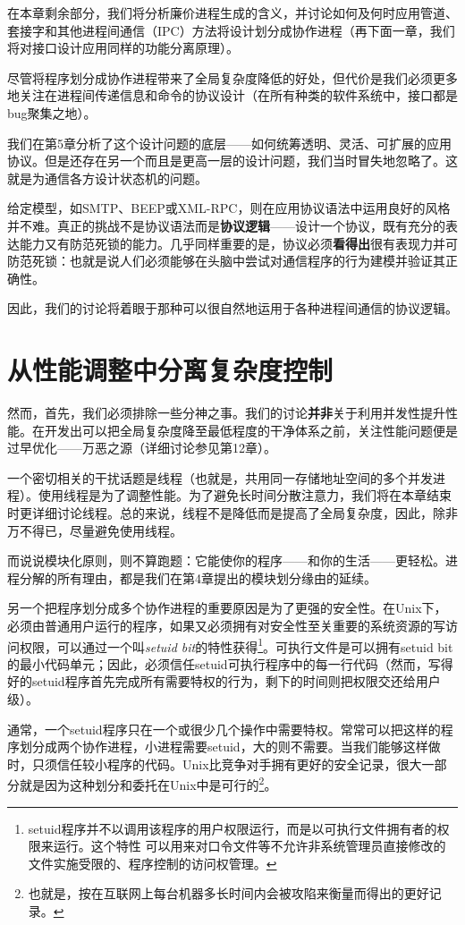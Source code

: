 \documentclass[12pt,oneside]{book}
\begin{document}
在本章剩余部分，我们将分析廉价进程生成的含义，并讨论如何及何时应用管道、套接字和其他进程间通信（IPC）方法将设计划分成协作进程（再下面一章，我们将对接口设计应用同样的功能分离原理）。

尽管将程序划分成协作进程带来了全局复杂度降低的好处，但代价是我们必须更多地关注在进程间传递信息和命令的协议设计（在所有种类的软件系统中，接口都是bug聚集之地）。

我们在第5章分析了这个设计问题的底层——如何统筹透明、灵活、可扩展的应用协议。但是还存在另一个而且是更高一层的设计问题，我们当时冒失地忽略了。这就是为通信各方设计状态机的问题。

给定模型，如SMTP、BEEP或XML-RPC，则在应用协议语法中运用良好的风格并不难。真正的挑战不是协议语法而是\textbf{协议逻辑}——设计一个协议，既有充分的表达能力又有防范死锁的能力。几乎同样重要的是，协议必须\textbf{看得出}很有表现力并可防范死锁：也就是说人们必须能够在头脑中尝试对通信程序的行为建模并验证其正确性。

因此，我们的讨论将着眼于那种可以很自然地运用于各种进程间通信的协议逻辑。

\section{从性能调整中分离复杂度控制}
然而，首先，我们必须排除一些分神之事。我们的讨论\textbf{并非}关于利用并发性提升性能。在开发出可以把全局复杂度降至最低程度的干净体系之前，关注性能问题便是过早优化——万恶之源（详细讨论参见第12章）。

一个密切相关的干扰话题是线程（也就是，共用同一存储地址空间的多个并发进程）。使用线程是为了调整性能。为了避免长时间分散注意力，我们将在本章结束时更详细讨论线程。总的来说，线程不是降低而是提高了全局复杂度，因此，除非万不得已，尽量避免使用线程。

而说说模块化原则，则不算跑题：它能使你的程序——和你的生活——更轻松。进程分解的所有理由，都是我们在第4章提出的模块划分缘由的延续。

另一个把程序划分成多个协作进程的重要原因是为了更强的安全性。在Unix下，必须由普通用户运行的程序，如果又必须拥有对安全性至关重要的系统资源的写访问权限，可以通过一个叫\textit{setuid bit}的特性获得\footnote{setuid程序并不以调用该程序的用户权限运行，而是以可执行文件拥有者的权限来运行。这个特性
可以用来对口令文件等不允许非系统管理员直接修改的文件实施受限的、程序控制的访问权管理。}。可执行文件是可以拥有setuid bit的最小代码单元；因此，必须信任setuid可执行程序中的每一行代码（然而，写得好的setuid程序首先完成所有需要特权的行为，剩下的时间则把权限交还给用户级）。

通常，一个setuid程序只在一个或很少几个操作中需要特权。常常可以把这样的程序划分成两个协作进程，小进程需要setuid，大的则不需要。当我们能够这样做时，只须信任较小程序的代码。Unix比竞争对手拥有更好的安全记录，很大一部分就是因为这种划分和委托在Unix中是可行的\footnote{也就是，按在互联网上每台机器多长时间内会被攻陷来衡量而得出的更好记录。}。
\end{document}
